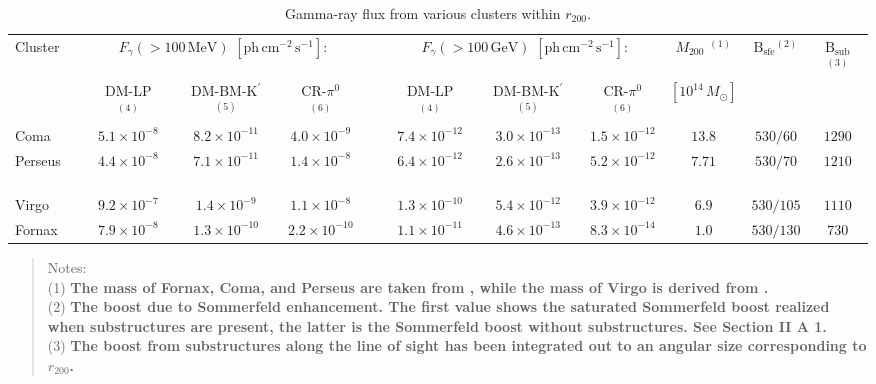 \documentclass[10pt,aps,pra,reprint,amsmath,amsfonts,amssymb,showpacs,nofootinbib,floatfix]{revtex4-1}
\def\C#1{{\bf #1}}
\newcommand{\rmn}{\mathrm}
\newcommand{\msun}{M_\odot}
\newcommand{\Kp}{\rmn{K}^\prime}
\newcommand{\B}{\rmn{B}}
\newcommand{\rvir}{r_{200}}
\newcommand{\mvir}{M_{200}}
\begin{document}
\begin{table}
\begin{minipage}{2.0\columnwidth}
  \caption{Gamma-ray flux from various clusters within $\rvir$.}
\begin{tabular}{l  c c c  c  c c c c c c}
\hline
\hline
 Cluster &
\multicolumn{3}{c}{$F_{\gamma}(>100\,\rmn{MeV})$ $[\rmn{ph}\,\rmn{cm}^{-2}\,\rmn{s}^{-1}]$:} & &
\multicolumn{3}{c}{$F_{\gamma}(>100\,\rmn{GeV})$ $[\rmn{ph}\,\rmn{cm}^{-2}\,\rmn{s}^{-1}]$:} & 
$\mvir$ $^{(1)}$ & $\B_\rmn{sfe} $$^{(2)}$ &  $\B_\rmn{sub} $$^{(3)}$ \\
         & DM-LP $^{(4)}$ & DM-BM-$\Kp$ $^{(5)}$ & CR-$\pi^0$ $^{(6)}$ 
         & & DM-LP $^{(4)}$ & DM-BM-$\Kp$ $^{(5)}$ & CR-$\pi^0$ $^{(6)}$ & $[10^{14}\,\msun]$ &&  \\
 \hline
 Coma                 & $5.1\times10^{-8}$  & $8.2\times10^{-11}$ & $4.0\times10^{-9}$  
 & \,\,\,\,\,         & $7.4\times10^{-12}$ & $3.0\times10^{-13}$ & $1.5\times10^{-12}$ 
 & $13.8$ & $530/60$  & $1290$ \\
 Perseus \,\,\,\,\,\, & $4.4\times10^{-8}$  & $7.1\times10^{-11}$ & $1.4\times10^{-8}$  
 & \,\,\,\,\,         & $6.4\times10^{-12}$ & $2.6\times10^{-13}$ & $5.2\times10^{-12}$ 
 & $7.71$ & $530/70$  & $1210$ \\
 Virgo                & $9.2\times10^{-7}$  & $1.4\times10^{-9}$ & $1.1\times10^{-8}$  
 & \,\,\,\,\,         & $1.3\times10^{-10}$ & $5.4\times10^{-12}$ & $3.9\times10^{-12}$ 
 & $6.9$  & $530/105$  & $1110$  \\
 Fornax               & $7.9\times10^{-8}$  & $1.3\times10^{-10}$ & $2.2\times10^{-10}$ 
 & \,\,\,\,\,         & $1.1\times10^{-11}$ & $4.6\times10^{-13}$ & $8.3\times10^{-14}$ 
 & $1.0$  & $530/130$  & $730$  \\
\hline
\hline
\end{tabular}
\begin{quote}
  Notes: \\
  (1) \C{The mass of Fornax, Coma, and Perseus are taken from \cite{2002ApJ...567..716R}, 
  while the mass of Virgo is derived from \cite{1984ApJ...281...31T}.}\\
  (2) \C{The boost due to Sommerfeld enhancement. The first value shows the saturated 
  Sommerfeld boost realized when substructures are present, the latter is the Sommerfeld 
  boost without substructures. See Section II A 1.}\\
  (3) \C{The boost from substructures along the line of sight has been integrated 
    out to an angular size corresponding to $\rvir$.}\\

\end{quote}
\end{minipage}
\end{table}
\end{document}
